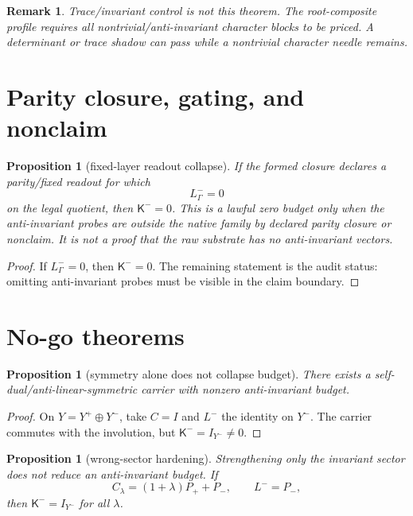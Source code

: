 \documentclass[11pt]{article}
\newtheorem{proposition}[theorem]{Proposition}
\newtheorem{remark}[theorem]{Remark}
\begin{document}
\begin{remark}
Trace/invariant control is not this theorem.  The root-composite profile requires all nontrivial/anti-invariant character blocks to be priced.  A determinant or trace shadow can pass while a nontrivial character needle remains.
\end{remark}

\section{Parity closure, gating, and nonclaim}

\begin{proposition}[fixed-layer readout collapse]
If the formed closure declares a parity/fixed readout for which
\[
  L^-_\Gamma=0
\]
 on the legal quotient, then \(\mathsf K^-=0\).  This is a lawful zero budget only when the anti-invariant probes are outside the native family by declared parity closure or nonclaim.  It is not a proof that the raw substrate has no anti-invariant vectors.
\end{proposition}

\begin{proof}
If \(L^-_\Gamma=0\), then \(\mathsf K^-=0\).  The remaining statement is the audit status: omitting anti-invariant probes must be visible in the claim boundary.
\end{proof}

\section{No-go theorems}

\begin{proposition}[symmetry alone does not collapse budget]
There exists a self-dual/anti-linear-symmetric carrier with nonzero anti-invariant budget.
\end{proposition}

\begin{proof}
On \(Y=Y^+\oplus Y^-\), take \(C=I\) and \(L^-\) the identity on \(Y^-\).  The carrier commutes with the involution, but \(\mathsf K^-=I_{Y^-}\ne0\).
\end{proof}

\begin{proposition}[wrong-sector hardening]
Strengthening only the invariant sector does not reduce an anti-invariant budget.  If
\[
  C_\lambda=(1+\lambda)P_+ + P_-,
  \qquad L^-=P_- ,
\]
then \(\mathsf K^-=I_{Y^-}\) for all \(\lambda\).
\end{proposition}
\end{document}
